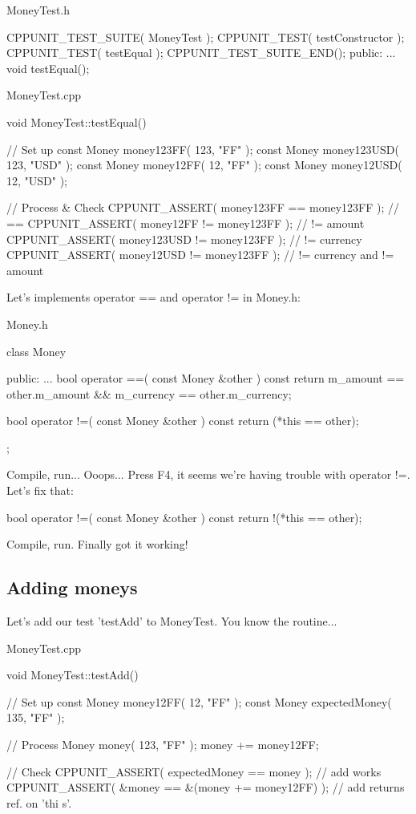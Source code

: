 {\ttfamily MoneyTest.h} 
\begin{DoxyCode}
  CPPUNIT_TEST_SUITE( MoneyTest );
  CPPUNIT_TEST( testConstructor );
  CPPUNIT_TEST( testEqual );
  CPPUNIT_TEST_SUITE_END();
public:
  ...
  void testEqual();
\end{DoxyCode}


{\ttfamily MoneyTest.cpp} 
\begin{DoxyCode}
void
MoneyTest::testEqual()
{
  // Set up
  const Money money123FF( 123, "FF" );
  const Money money123USD( 123, "USD" );
  const Money money12FF( 12, "FF" );
  const Money money12USD( 12, "USD" );

  // Process & Check
  CPPUNIT_ASSERT( money123FF == money123FF );     // ==
  CPPUNIT_ASSERT( money12FF != money123FF );      // != amount
  CPPUNIT_ASSERT( money123USD != money123FF );    // != currency
  CPPUNIT_ASSERT( money12USD != money123FF );     // != currency and != amount
}
\end{DoxyCode}


Let's implements {\ttfamily operator} {\ttfamily ==} and {\ttfamily operator} {\ttfamily !=} in Money.h:

{\ttfamily Money.h} 
\begin{DoxyCode}
class Money
{
public:
...
  bool operator ==( const Money &other ) const
  {
    return m_amount == other.m_amount  &&  
           m_currency == other.m_currency;
  }

  bool operator !=( const Money &other ) const
  {
    return (*this == other);
  }
};
\end{DoxyCode}


Compile, run... Ooops... Press F4, it seems we're having trouble with {\ttfamily operator} {\ttfamily !=}. Let's fix that: 
\begin{DoxyCode}
  bool operator !=( const Money &other ) const
  {
    return !(*this == other);
  }
\end{DoxyCode}


Compile, run. Finally got it working!\hypertarget{money_example_sec_opadd}{}\subsection{Adding moneys}\label{money_example_sec_opadd}
Let's add our test 'testAdd' to MoneyTest. You know the routine...

{\ttfamily MoneyTest.cpp} 
\begin{DoxyCode}
void 
MoneyTest::testAdd()
{
  // Set up
  const Money money12FF( 12, "FF" );
  const Money expectedMoney( 135, "FF" );

  // Process
  Money money( 123, "FF" );
  money += money12FF;

  // Check
  CPPUNIT_ASSERT( expectedMoney == money );           // add works
  CPPUNIT_ASSERT( &money == &(money += money12FF) );  // add returns ref. on 'thi
      s'.
}
\end{DoxyCode}


